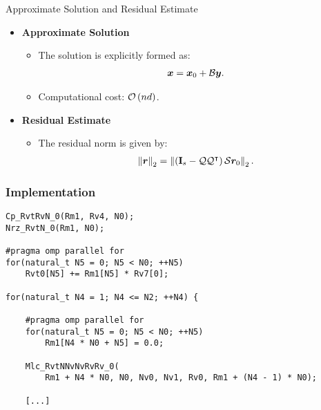 \begin{frame}{Approximate Solution and Residual Estimate}
    \begin{itemize}
        \item \textbf{Approximate Solution}
        \begin{itemize}
            \item The solution is explicitly formed as:
            \begin{align}
                \bm{x} = \bm{x}_0 + \mathcal{B} \bm{y}.
            \end{align}
            \item Computational cost: $\mathcal{O} \left( n d \right)$.
        \end{itemize}
        \vspace{0.5cm}
        \item \textbf{Residual Estimate} 
        \begin{itemize}
            \item The residual norm is given by:
            \begin{align}
                \left\lVert \bm{r} \right\rVert_2 = 
                \left\lVert  \left( \mathbf{I}_s - \mathcal{Q} \mathcal{Q}^{\intercal} \right) \mathcal{S} \bm{r}_0  \right\rVert_2.
            \end{align}
        \end{itemize}
    \end{itemize}
\end{frame}

\begin{frame}[fragile] %
    \frametitle{Implementation}

\begin{lstlisting}[style=cpp]
Cp_RvtRvN_0(Rm1, Rv4, N0);
Nrz_RvtN_0(Rm1, N0);

#pragma omp parallel for
for(natural_t N5 = 0; N5 < N0; ++N5)
    Rvt0[N5] += Rm1[N5] * Rv7[0];

for(natural_t N4 = 1; N4 <= N2; ++N4) {

    #pragma omp parallel for
    for(natural_t N5 = 0; N5 < N0; ++N5)
        Rm1[N4 * N0 + N5] = 0.0;

    Mlc_RvtNNvNvRvRv_0(
        Rm1 + N4 * N0, N0, Nv0, Nv1, Rv0, Rm1 + (N4 - 1) * N0);

    [...]
\end{lstlisting}

\end{frame}

